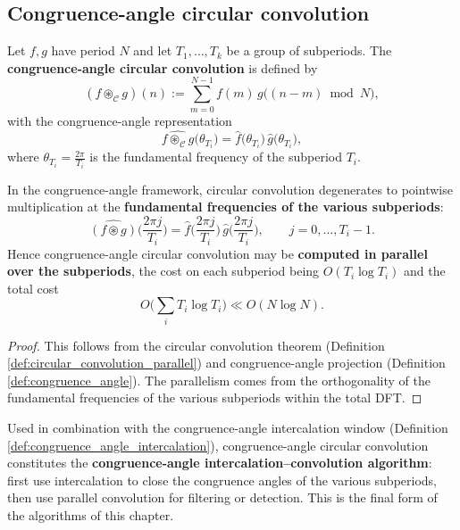 \subsection{Congruence-angle circular convolution}

\begin{definition}\label{def:congruence_angle_convolution}
Let $f,g$ have period $N$ and let $T_1,\dots,T_k$ be a group of subperiods. The \textbf{congruence-angle circular convolution} is defined by
\[
(f\circledast_{\mathcal{C}}g)(n):=\sum_{m=0}^{N-1}f(m)\,g\big((n-m)\bmod N\big),
\]
with the congruence-angle representation
\[
\widehat{f\circledast_{\mathcal{C}}g}\big(\theta_{T_i}\big)
=\hat f\big(\theta_{T_i}\big)\,\hat g\big(\theta_{T_i}\big),
\]
where $\theta_{T_i}=\frac{2\pi}{T_i}$ is the fundamental frequency of the subperiod $T_i$.
\end{definition}

\begin{theorem}\label{thm:congruence_angle_convolution_theorem}
In the congruence-angle framework, circular convolution degenerates to pointwise multiplication at the \textbf{fundamental frequencies of the various subperiods}:
\[
\widehat{(f\circledast g)}\Big(\frac{2\pi j}{T_i}\Big)
=\hat f\Big(\frac{2\pi j}{T_i}\Big)\,
\hat g\Big(\frac{2\pi j}{T_i}\Big),
\qquad j=0,\dots,T_i-1.
\]
Hence congruence-angle circular convolution may be \textbf{computed in parallel over the subperiods}, the cost on each subperiod being $O(T_i\log T_i)$ and the total cost
\[
O\!\Big(\sum_i T_i\log T_i\Big)\ll O(N\log N).
\]
\end{theorem}

\begin{proof}
This follows from the circular convolution theorem (Definition \ref{def:circular_convolution_parallel}) and congruence-angle projection (Definition \ref{def:congruence_angle}). The parallelism comes from the orthogonality of the fundamental frequencies of the various subperiods within the total DFT.
\end{proof}

\begin{remark}\label{rem:congruence_convolution_intercalation}
Used in combination with the congruence-angle intercalation window (Definition \ref{def:congruence_angle_intercalation}), congruence-angle circular convolution constitutes the \textbf{congruence-angle intercalation--convolution algorithm}: first use intercalation to close the congruence angles of the various subperiods, then use parallel convolution for filtering or detection. This is the final form of the algorithms of this chapter.
\end{remark}

